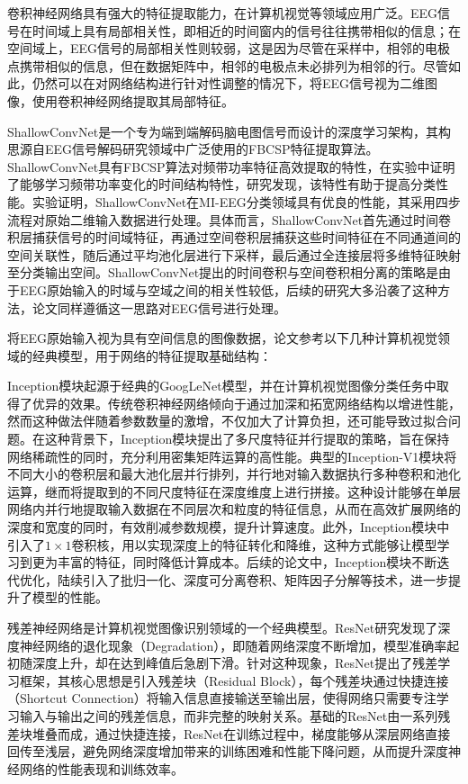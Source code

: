 卷积神经网络具有强大的特征提取能力，在计算机视觉等领域应用广泛。EEG信号在时间域上具有局部相关性，即相近的时间窗内的信号往往携带相似的信息；在空间域上，EEG信号的局部相关性则较弱，这是因为尽管在采样中，相邻的电极点携带相似的信息，但在数据矩阵中，相邻的电极点未必排列为相邻的行。尽管如此，仍然可以在对网络结构进行针对性调整的情况下，将EEG信号视为二维图像，使用卷积神经网络提取其局部特征。

ShallowConvNet\cite{schirrmeister2017deep}是一个专为端到端解码脑电图信号而设计的深度学习架构，其构思源自EEG信号解码研究领域中广泛使用的FBCSP特征提取算法。ShallowConvNet具有FBCSP算法对频带功率特征高效提取的特性，在实验中证明了能够学习频带功率变化的时间结构特性\cite{schirrmeister2017deep}，研究发现，该特性有助于提高分类性能\cite{sakhavi2015parallel}。实验证明，ShallowConvNet在MI-EEG分类领域具有优良的性能\cite{lawhern2018eegnet}，其采用四步流程对原始二维输入数据进行处理。具体而言，ShallowConvNet首先通过时间卷积层捕获信号的时间域特征，再通过空间卷积层捕获这些时间特征在不同通道间的空间关联性，随后通过平均池化层进行下采样，最后通过全连接层将多维特征映射至分类输出空间。ShallowConvNet提出的时间卷积与空间卷积相分离的策略是由于EEG原始输入的时域与空域之间的相关性较低，后续的研究大多沿袭了这种方法，论文同样遵循这一思路对EEG信号进行处理。

将EEG原始输入视为具有空间信息的图像数据，论文参考以下几种计算机视觉领域的经典模型，用于网络的特征提取基础结构：

Inception模块起源于经典的GoogLeNet模型\cite{szegedy2015going}，并在计算机视觉图像分类任务中取得了优异的效果。传统卷积神经网络倾向于通过加深和拓宽网络结构以增进性能，然而这种做法伴随着参数数量的激增，不仅加大了计算负担，还可能导致过拟合问题。在这种背景下，Inception模块提出了多尺度特征并行提取的策略，旨在保持网络稀疏性的同时，充分利用密集矩阵运算的高性能。典型的Inception-V1模块将不同大小的卷积层和最大池化层并行排列，并行地对输入数据执行多种卷积和池化运算，继而将提取到的不同尺度特征在深度维度上进行拼接。这种设计能够在单层网络内并行地提取输入数据在不同层次和粒度的特征信息，从而在高效扩展网络的深度和宽度的同时，有效削减参数规模，提升计算速度。此外，Inception模块中引入了\(1\times1\)卷积核，用以实现深度上的特征转化和降维，这种方式能够让模型学习到更为丰富的特征，同时降低计算成本。后续的论文中，Inception模块不断迭代优化，陆续引入了批归一化、深度可分离卷积、矩阵因子分解等技术，进一步提升了模型的性能\cite{szegedy2016rethinking,szegedy2017inception}。

残差神经网络是计算机视觉图像识别领域的一个经典模型。ResNet研究发现了深度神经网络的退化现象（Degradation），即随着网络深度不断增加，模型准确率起初随深度上升，却在达到峰值后急剧下滑。针对这种现象，ResNet提出了残差学习框架，其核心思想是引入残差块（Residual Block），每个残差块通过快捷连接（Shortcut Connection）将输入信息直接输送至输出层，使得网络只需要专注学习输入与输出之间的残差信息，而非完整的映射关系。基础的ResNet由一系列残差块堆叠而成，通过快捷连接，ResNet在训练过程中，梯度能够从深层网络直接回传至浅层，避免网络深度增加带来的训练困难和性能下降问题，从而提升深度神经网络的性能表现和训练效率。

